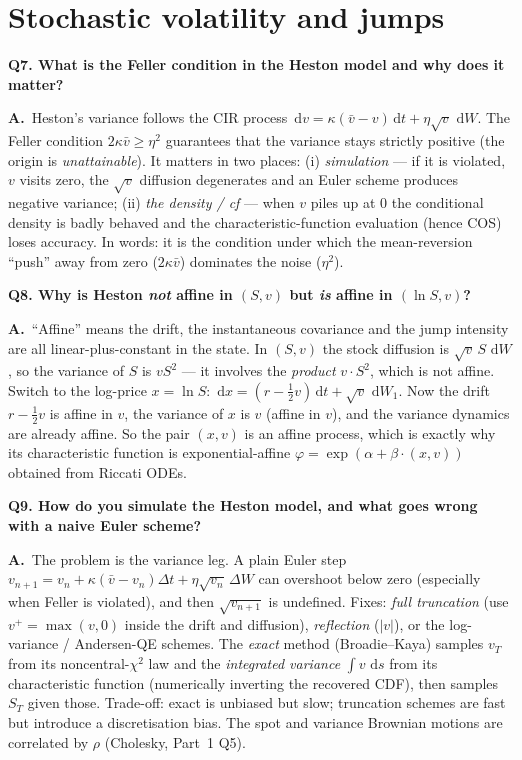 \documentclass[11pt]{article}
\newcommand{\dd}{\,\mathrm{d}}
\newcommand{\ch}{\varphi}
\newcommand{\Qq}[1]{\bigskip\noindent\textbf{\large #1}\par\nobreak\smallskip}
\newcommand{\A}{\noindent\textbf{A.}\ }
\begin{document}
\section{Stochastic volatility and jumps}

\Qq{Q7. What is the Feller condition in the Heston model and why does it matter?}
\A Heston's variance follows the CIR process $\dd v=\kappa(\bar v-v)\dd t+\eta\sqrt v\,\dd W$. The Feller
condition $2\kappa\bar v\ge\eta^2$ guarantees that the variance stays strictly positive (the origin is
\emph{unattainable}). It matters in two places: (i) \emph{simulation} --- if it is violated, $v$ visits zero,
the $\sqrt v$ diffusion degenerates and an Euler scheme produces negative variance; (ii) \emph{the density / cf}
--- when $v$ piles up at $0$ the conditional density is badly behaved and the characteristic-function evaluation
(hence COS) loses accuracy. In words: it is the condition under which the mean-reversion ``push'' away from zero
($2\kappa\bar v$) dominates the noise ($\eta^2$).

\Qq{Q8. Why is Heston \emph{not} affine in $(S,v)$ but \emph{is} affine in $(\ln S,v)$?}
\A ``Affine'' means the drift, the instantaneous covariance and the jump intensity are all linear-plus-constant
in the state. In $(S,v)$ the stock diffusion is $\sqrt v\,S\,\dd W$, so the variance of $S$ is $vS^2$ --- it
involves the \emph{product} $v\cdot S^2$, which is not affine. Switch to the log-price $x=\ln S$:
$\dd x=(r-\tfrac12 v)\dd t+\sqrt v\,\dd W_1$. Now the drift $r-\tfrac12 v$ is affine in $v$, the variance of
$x$ is $v$ (affine in $v$), and the variance dynamics are already affine. So the pair $(x,v)$ is an affine
process, which is exactly why its characteristic function is exponential-affine
$\ch=\exp(\alpha+\beta\cdot(x,v))$ obtained from Riccati ODEs.

\Qq{Q9. How do you simulate the Heston model, and what goes wrong with a naive Euler scheme?}
\A The problem is the variance leg. A plain Euler step
$v_{n+1}=v_n+\kappa(\bar v-v_n)\Delta t+\eta\sqrt{v_n}\,\Delta W$ can overshoot below zero (especially when
Feller is violated), and then $\sqrt{v_{n+1}}$ is undefined. Fixes: \emph{full truncation} (use
$v^+=\max(v,0)$ inside the drift and diffusion), \emph{reflection} ($|v|$), or the log-variance / Andersen-QE
schemes. The \emph{exact} method (Broadie--Kaya) samples $v_T$ from its noncentral-$\chi^2$ law and the
\emph{integrated variance} $\int v\,\dd s$ from its characteristic function (numerically inverting the recovered
CDF), then samples $S_T$ given those. Trade-off: exact is unbiased but slow; truncation schemes are fast but
introduce a discretisation bias. The spot and variance Brownian motions are correlated by $\rho$ (Cholesky,
Part~1 Q5).
\end{document}
